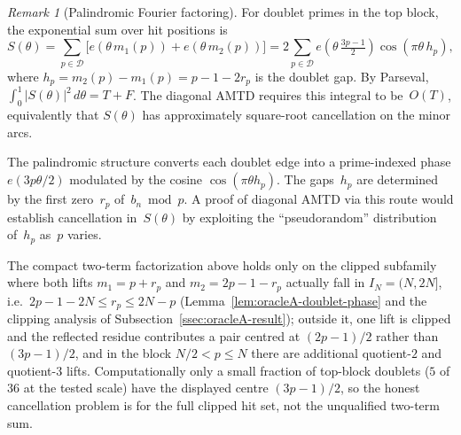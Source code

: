 \documentclass[11pt]{article}
\theoremstyle{definition}
\theoremstyle{remark}
\newtheorem{remark}[theorem]{Remark}
\begin{document}
\begin{remark}[Palindromic Fourier factoring]
\label{rem:palindromic-fourier}
For doublet primes in the top block,
the exponential sum over hit positions is
\[
  S(\theta)
  = \sum_{p \in \mathcal{D}}
  \bigl[e\!\left(\theta\,m_1(p)\right)
  + e\!\left(\theta\,m_2(p)\right)\bigr]
  = 2\sum_{p \in \mathcal{D}}
  e\!\left(\theta\,\tfrac{3p-1}{2}\right)
  \cos\!\left(\pi\theta\,h_p\right),
\]
where $h_p = m_2(p) - m_1(p) = p - 1 - 2r_p$
is the doublet gap.
By Parseval,
$\int_0^1 |S(\theta)|^2\,d\theta = T + F$.
The diagonal AMTD requires this integral
to be~$O(T)$, equivalently that $S(\theta)$
has approximately square-root cancellation
on the minor arcs.

The palindromic structure converts each
doublet edge into a prime-indexed phase
$e(3p\theta/2)$ modulated by the cosine
$\cos(\pi\theta h_p)$.
The gaps~$h_p$ are determined by the
first zero~$r_p$ of~$b_n \bmod p$.
A proof of diagonal AMTD via this route
would establish cancellation in~$S(\theta)$
by exploiting the ``pseudorandom'' distribution
of~$h_p$ as~$p$ varies.

The compact two-term factorization above holds
only on the clipped subfamily where both lifts
$m_1 = p + r_p$ and $m_2 = 2p - 1 - r_p$ actually
fall in $I_N = (N, 2N]$, i.e.\
$2p - 1 - 2N \le r_p \le 2N - p$
(Lemma~\ref{lem:oracleA-doublet-phase} and the
clipping analysis of
Subsection~\ref{ssec:oracleA-result}); outside it,
one lift is clipped and the reflected residue
contributes a pair centred at $(2p-1)/2$ rather than
$(3p-1)/2$, and in the block $N/2 < p \le N$ there are
additional quotient-$2$ and quotient-$3$ lifts.
Computationally only a small fraction of top-block
doublets ($5$ of $36$ at the tested scale) have the
displayed centre $(3p-1)/2$, so the honest
cancellation problem is for the full clipped hit
set, not the unqualified two-term sum.
\end{remark}
\end{document}

